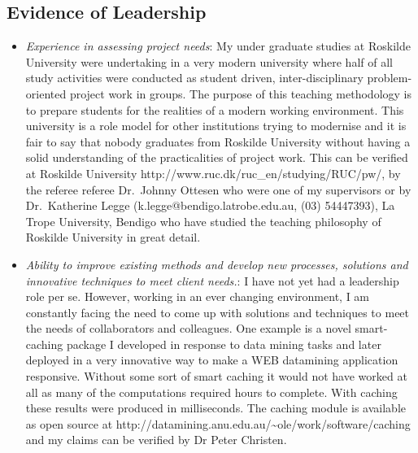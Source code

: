 \documentclass[12pt,a4paper]{article}
\begin{document}
\subsection*{Evidence of Leadership}
\begin{itemize}
  \item \textit{Experience in assessing project needs}: 
  My under graduate studies at Roskilde University 
  were undertaking in a very modern university
  where half of all study activities were conducted as
  student driven, inter-disciplinary problem-oriented 
  project work in groups. 
  The purpose of this teaching methodology is to 
  prepare students for the realities of a modern working environment.
  This university is a role model for other institutions
  trying to modernise and it is fair to say that nobody graduates from
  Roskilde University without having a solid understanding of the 
  practicalities of project work.
  This can be verified at Roskilde University
  http://www.ruc.dk/ruc\_en/studying/RUC/pw/, by the referee
  referee Dr.\ Johnny Ottesen who were one of my supervisors
  or by Dr.\ Katherine Legge (k.legge@bendigo.latrobe.edu.au, (03) 54447393), 
  La Trope University, Bendigo who have studied the teaching philosophy 
  of Roskilde University in great detail.
  
  \item \textit{Ability to improve existing methods and develop new processes, solutions and innovative techniques to meet client needs.}: 
  I have not yet had a leadership role per se.
  However, working in an ever changing environment, I am constantly facing
  the need to come up with solutions and techniques to meet the needs 
  of collaborators and colleagues.
  One example is a novel smart-caching package I developed in response to
  data mining tasks and later deployed in a very innovative way
  to make a WEB datamining application responsive. Without some sort of
  smart caching it would not have worked at all as many of the computations
  required hours to complete. With caching these results were produced 
  in milliseconds.
  The caching module is available as open source at
  http://datamining.anu.edu.au/\~{}ole/work/software/caching
  and my claims can be verified by Dr Peter Christen. 
  

\end{itemize} 
\end{document}
